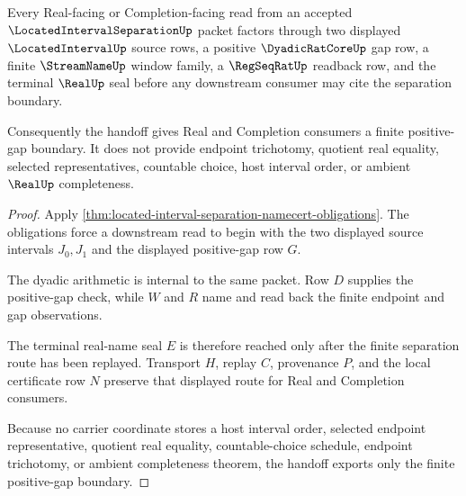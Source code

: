 \begin{theorem}
\label{thm:located-interval-separation-real-completion-handoff}
Every Real-facing or Completion-facing read from an accepted $\LocatedIntervalSeparationUp$ packet factors through two displayed $\LocatedIntervalUp$ source rows, a positive $\DyadicRatCoreUp$ gap row, a finite $\StreamNameUp$ window family, a $\RegSeqRatUp$ readback row, and the terminal $\RealUp$ seal before any downstream consumer may cite the separation boundary.

Consequently the handoff gives Real and Completion consumers a finite positive-gap boundary. It does not provide endpoint trichotomy, quotient real equality, selected representatives, countable choice, host interval order, or ambient $\RealUp$ completeness.
\end{theorem}
\begin{proof}
Apply \autoref{thm:located-interval-separation-namecert-obligations}. The obligations force a downstream read to begin with the two displayed source intervals $J_0,J_1$ and the displayed positive-gap row $G$.

The dyadic arithmetic is internal to the same packet. Row $D$ supplies the positive-gap check, while $W$ and $R$ name and read back the finite endpoint and gap observations.

The terminal real-name seal $E$ is therefore reached only after the finite separation route has been replayed. Transport $H$, replay $C$, provenance $P$, and the local certificate row $N$ preserve that displayed route for Real and Completion consumers.

Because no carrier coordinate stores a host interval order, selected endpoint representative, quotient real equality, countable-choice schedule, endpoint trichotomy, or ambient completeness theorem, the handoff exports only the finite positive-gap boundary.
\end{proof}



